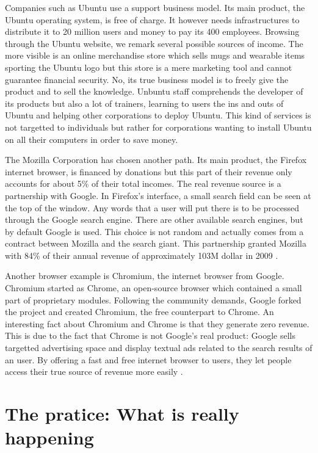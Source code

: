 \documentclass[12pt]{article}
\begin{document}
Companies such as Ubuntu use a support business model. Its main
product, the Ubuntu operating system, is free of charge. It however
needs infrastructures to distribute it to 20 million users and money
to pay its 400 employees. Browsing through the Ubuntu website, we
remark several possible sources of income. The more visible is an
online merchandise store which sells mugs and wearable items sporting
the Ubuntu logo but this store is a mere marketing tool and cannot
guarantee financial security.  No, its true business model is to
freely give the product and to sell the knowledge. Unbuntu staff
comprehends the developer of its products but also a lot of trainers,
learning to users the ins and outs of Ubuntu and helping other
corporations to deploy Ubuntu. This kind of services is not targetted
to individuals but rather for corporations wanting to install Ubuntu
on all their computers in order to save money.

The Mozilla Corporation has chosen another path. Its main product, the
Firefox internet browser, is financed by donations but this part of
their revenue only accounts for about 5\% of their total incomes. The
real revenue source is a partnership with Google. In Firefox's
interface, a small search field can be seen at the top of the
window. Any words that a user will put there is to be processed
through the Google search engine. There are other available search
engines, but by default Google is used. This choice is not random and
actually comes from a contract between Mozilla and the search
giant. This partnership granted Mozilla with 84\% of their annual
revenue of approximately 103M dollar in 2009 \cite{moz}.

Another browser example is Chromium, the internet browser from
Google. Chromium started as Chrome, an open-source browser which
contained a small part of proprietary modules. Following the community
demands, Google forked the project and created Chromium, the free
counterpart to Chrome. An interesting fact about Chromium and Chrome
is that they generate zero revenue. This is due to the fact that
Chrome is not Google's real product: Google sells targetted
advertising space and display textual ads related to the search
results of an user. By offering a fast and free internet browser to
users, they let people access their true source of revenue more
easily \cite{shuttle}.

\section{The pratice: What is really happening}
\end{document}
